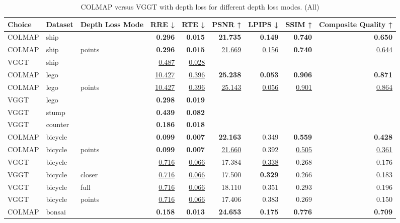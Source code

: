 \begin{table}[H]
\caption{COLMAP versus VGGT with depth loss for different depth loss modes. (All)}
\label{tab:05_depth_loss_mode_all}
\small
\begin{tabular}{lllrrrrrr}
\toprule
Choice & Dataset & Depth Loss Mode & RRE ↓ & RTE ↓ & PSNR ↑ & LPIPS ↓ & SSIM ↑ & Composite Quality ↑ \\
\midrule
COLMAP & ship &  & \textbf{0.296} & \textbf{0.015} & \textbf{21.735} & \textbf{0.149} & \textbf{0.740} & \textbf{0.650} \\
COLMAP & ship & points & \textbf{0.296} & \textbf{0.015} & \underline{21.669} & \underline{0.156} & \textbf{0.740} & \underline{0.644} \\
VGGT & ship &  & \underline{0.487} & \underline{0.028} &  &  &  &  \\
\midrule
COLMAP & lego &  & \underline{10.427} & \underline{0.396} & \textbf{25.238} & \textbf{0.053} & \textbf{0.906} & \textbf{0.871} \\
COLMAP & lego & points & \underline{10.427} & \underline{0.396} & \underline{25.143} & \underline{0.056} & \underline{0.901} & \underline{0.864} \\
VGGT & lego &  & \textbf{0.298} & \textbf{0.019} &  &  &  &  \\
\midrule
VGGT & stump &  & \textbf{0.439} & \textbf{0.082} &  &  &  &  \\
\midrule
VGGT & counter &  & \textbf{0.186} & \textbf{0.018} &  &  &  &  \\
\midrule
COLMAP & bicycle &  & \textbf{0.099} & \textbf{0.007} & \textbf{22.163} & 0.349 & \textbf{0.559} & \textbf{0.428} \\
COLMAP & bicycle & points & \textbf{0.099} & \textbf{0.007} & \underline{21.660} & 0.392 & \underline{0.505} & \underline{0.361} \\
VGGT & bicycle &  & \underline{0.716} & \underline{0.066} & 17.384 & \underline{0.338} & 0.268 & 0.176 \\
VGGT & bicycle & closer & \underline{0.716} & \underline{0.066} & 17.500 & \textbf{0.329} & 0.266 & 0.183 \\
VGGT & bicycle & full & \underline{0.716} & \underline{0.066} & 18.110 & 0.351 & 0.293 & 0.196 \\
VGGT & bicycle & points & \underline{0.716} & \underline{0.066} & 17.406 & 0.383 & 0.269 & 0.150 \\
\midrule
COLMAP & bonsai &  & \textbf{0.158} & \textbf{0.013} & \textbf{24.653} & \textbf{0.175} & \textbf{0.776} & \textbf{0.709} \\

\end{tabular}
\end{table}
